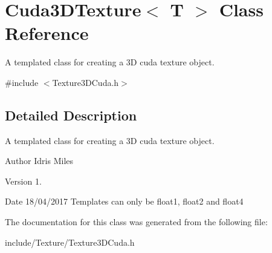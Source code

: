 \hypertarget{classCuda3DTexture_3_01T_01_4}{}\section{Cuda3\+D\+Texture$<$ T $>$ Class Reference}
\label{classCuda3DTexture_3_01T_01_4}


A templated class for creating a 3D cuda texture object.  




{\ttfamily \#include $<$Texture3\+D\+Cuda.\+h$>$}



\subsection{Detailed Description}
A templated class for creating a 3D cuda texture object. 

\begin{DoxyAuthor}{Author}
Idris Miles 
\end{DoxyAuthor}
\begin{DoxyVersion}{Version}
1. 
\end{DoxyVersion}
\begin{DoxyDate}{Date}
18/04/2017 Templates can only be float1, float2 and float4 
\end{DoxyDate}


The documentation for this class was generated from the following file\+:\begin{DoxyCompactItemize}
\item 
include/\+Texture/Texture3\+D\+Cuda.\+h\end{DoxyCompactItemize}
